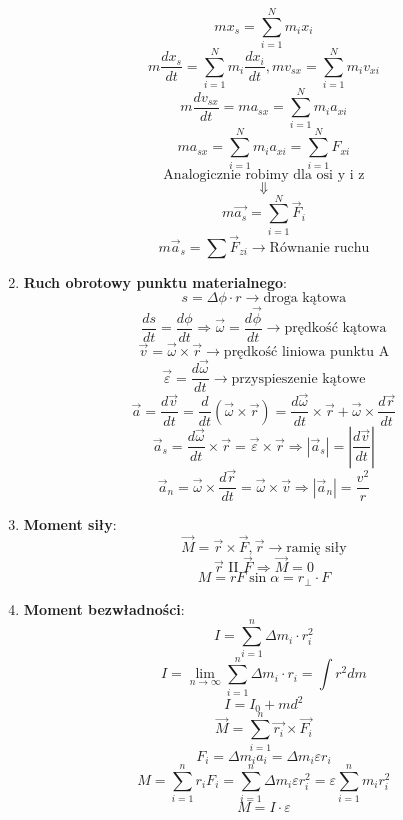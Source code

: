 \documentclass{article}
\begin{document}
\begin{enumerate}
\[		mx_s = \sum\limits_{i = 1}^N m_i x_i
		\]
		\[
		m \frac{dx_s}{dt} = \sum\limits_{i = 1}^N m_i \frac{dx_i}{dt},
		mv_{sx} = \sum\limits_{i = 1}^N m_i v_{xi}
		\]
		\[
		m \frac{dv_{sx}}{dt} = ma_{sx} = \sum\limits_{i = 1}^N m_i a_{xi}
		\]
		\[
		ma_{sx} = \sum\limits_{i = 1}^N m_i a_{xi} = \sum\limits_{i = 1}^N F_{xi}
		\]
		\[
		\text{Analogicznie robimy dla osi y i z}
		\]
		\[
		\Downarrow
		\]
		\[
		m \overrightarrow{a_s} = \sum\limits_{i = 1}^N \vec{F}_i
		\]
		\[
		m \vec{a}_s = \sum\vec{F}_{zi} \longrightarrow \text{Równanie ruchu}
		\]
		\item \textbf{Ruch obrotowy punktu materialnego}:
		\[
		s = \Delta\phi \cdot r \longrightarrow \text{droga kątowa}
		\]
		\[
		\frac{ds}{dt} = \frac{d \phi}{dt}
		\Rightarrow
		\vec{\omega} = \frac{d \vec{\phi}}{dt} \longrightarrow \text{prędkość kątowa}
		\]
		\[
		\vec{v} = \vec{\omega} \times \vec{r} \longrightarrow \text{prędkość liniowa punktu A}
		\]
		\[
		\vec{\varepsilon} = \frac{d \vec{\omega}}{dt} \longrightarrow \text{przyspieszenie kątowe}
		\]
		\[
		\vec{a} = \frac{d \vec{v}}{dt} = \frac{d}{dt} (\vec{\omega} \times \vec{r}) =
		\frac{d \vec{\omega}}{dt} \times \vec{r} + \vec{\omega} \times \frac{d \vec{r}}{dt}
		\]
		\[
		\vec{a}_s = \frac{d \vec{\omega}}{dt} \times \vec{r} = \vec{\varepsilon} \times \vec{r} \Rightarrow | \vec{a}_s | = \left| \frac{d \vec{v}}{dt} \right|
		\]
		\[
		\vec{a}_n = \vec{\omega} \times \frac{d \vec{r}}{dt} = \vec{\omega} \times \vec{v} \Rightarrow | \vec{a}_n | = \frac{v^2}{r}
		\]
		\item \textbf{Moment siły}:
		\[
		\vec{M} = \vec{r} \times \vec{F}, \vec{r} \longrightarrow \text{ramię siły}
		\]
		\[
		\vec{r} \text{ II } \vec{F} \Rightarrow \vec{M} = 0		
		\]
		\[
		M = rF\sin\alpha = r_{\perp} \cdot F
		\]
		\item \textbf{Moment bezwładności}:
		\[
		I = \sum\limits_{i = 1}^n \Delta m_i \cdot r^2_i
		\]
		\[
		I = \lim\limits_{n \rightarrow \infty} \sum\limits_{i = 1}^n \Delta m_i \cdot r_i = \int r^2 dm
		\]
		\[
		I = I_0 + md^2
		\]
		\[
		\vec{M} = \sum\limits_{i = 1}^n \vec{r_i} \times \vec{F_i}
		\]
		\[
		F_i = \Delta m_i a_i = \Delta m_i \varepsilon r_i
		\]
		\[
		M = \sum\limits_{i = 1}^n r_i F_i = \sum\limits_{i = 1}^n \Delta m_i \varepsilon r_i^2 = \varepsilon \sum\limits_{i = 1}^n m_i r_i^2
		\]
		\[
		M = I \cdot \varepsilon
\]
\end{enumerate}
\end{document}
